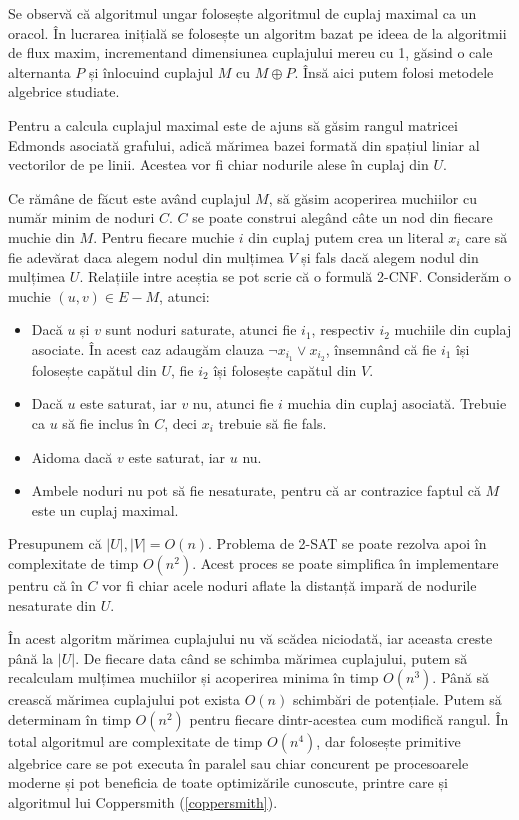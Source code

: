 Se observă că algoritmul ungar folosește algoritmul de cuplaj maximal ca un oracol. În lucrarea inițială se folosește un algoritm bazat pe
ideea de la algoritmii de flux maxim, incrementand dimensiunea cuplajului mereu cu 1, găsind o cale alternanta $P$ și înlocuind cuplajul $M$
cu $M \oplus P$. Însă aici putem folosi metodele algebrice studiate.

Pentru a calcula cuplajul maximal este de ajuns să găsim rangul matricei Edmonds asociată grafului, adică mărimea bazei formată din spațiul
liniar al vectorilor de pe linii. Acestea vor fi chiar nodurile alese în cuplaj din $U$.

Ce rămâne de făcut este având cuplajul $M$, să găsim acoperirea muchiilor cu număr minim de noduri $C$. $C$ se poate construi alegând
câte un nod din fiecare muchie din $M$. Pentru fiecare muchie $i$ din cuplaj putem crea un literal $x_{i}$ care să fie adevărat daca alegem
nodul din mulțimea $V$ și fals dacă alegem nodul din mulțimea $U$. Relațiile intre aceștia se pot scrie că o formulă 2-CNF. Considerăm o
muchie $(u,v) \in E - M$, atunci:
\begin{itemize}
  \item Dacă $u$ și $v$ sunt noduri saturate, atunci fie $i_{1}$, respectiv $i_{2}$ muchiile din cuplaj asociate. În acest caz adaugăm clauza
  $\neg x_{i_{1}} \lor x_{i_{2}}$, însemnând că fie $i_{1}$ își folosește capătul din $U$, fie $i_{2}$ își folosește capătul din $V$.
  \item Dacă $u$ este saturat, iar $v$ nu, atunci fie $i$ muchia din cuplaj asociată. Trebuie ca $u$ să fie inclus în $C$, deci $x_{i}$ trebuie
  să fie fals.
  \item Aidoma dacă $v$ este saturat, iar $u$ nu.
  \item Ambele noduri nu pot să fie nesaturate, pentru că ar contrazice faptul că $M$ este un cuplaj maximal.
\end{itemize}

Presupunem că $|U|, |V| = O(n)$. Problema de 2-SAT se poate rezolva apoi în complexitate de timp $O(n^{2})$. Acest proces se poate simplifica
în implementare pentru că în $C$ vor fi chiar acele noduri aflate la distanță impară de nodurile nesaturate din $U$.

În acest algoritm mărimea cuplajului nu vă scădea niciodată, iar aceasta creste până la $|U|$. De fiecare data când se schimba
mărimea cuplajului, putem să recalculam mulțimea muchiilor și acoperirea minima în timp $O(n^{3})$. Până să crească mărimea
cuplajului pot exista $O(n)$ schimbări de potențiale. Putem să determinam în timp $O(n^{2})$ pentru fiecare dintr-acestea
cum modifică rangul. În total algoritmul are complexitate de timp $O(n^{4})$, dar folosește primitive algebrice care se pot
executa în paralel sau chiar concurent pe procesoarele moderne și pot beneficia de toate optimizările cunoscute, printre care
și algoritmul lui Coppersmith (\ref{coppersmith}).

